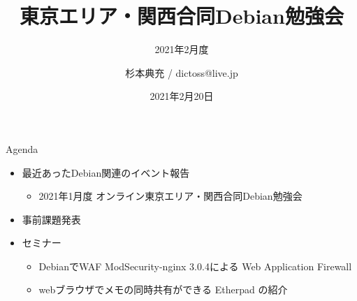 \title{東京エリア・関西合同Debian勉強会}
\subtitle{2021年2月度} %
\author{杉本典充 / dictoss@live.jp}
\date{2021年2月20日}



\begin{frame}
\titlepage{}
\end{frame}

\begin{frame}{Agenda}
 \begin{minipage}[t]{0.45\hsize}
  \begin{itemize}
  \item 最近あったDebian関連のイベント報告
    \begin{itemize}
    \item 2021年1月度 オンライン東京エリア・関西合同Debian勉強会
    \end{itemize}
  \item 事前課題発表
  \end{itemize}
 \end{minipage}
 \begin{minipage}[t]{0.45\hsize}
   \begin{itemize}
   \item セミナー
     \begin{itemize}
     \item DebianでWAF ModSecurity-nginx 3.0.4による Web Application Firewall
     \item webブラウザでメモの同時共有ができる Etherpad の紹介
     \end{itemize}
  \end{itemize}
 \end{minipage}
\end{frame}

